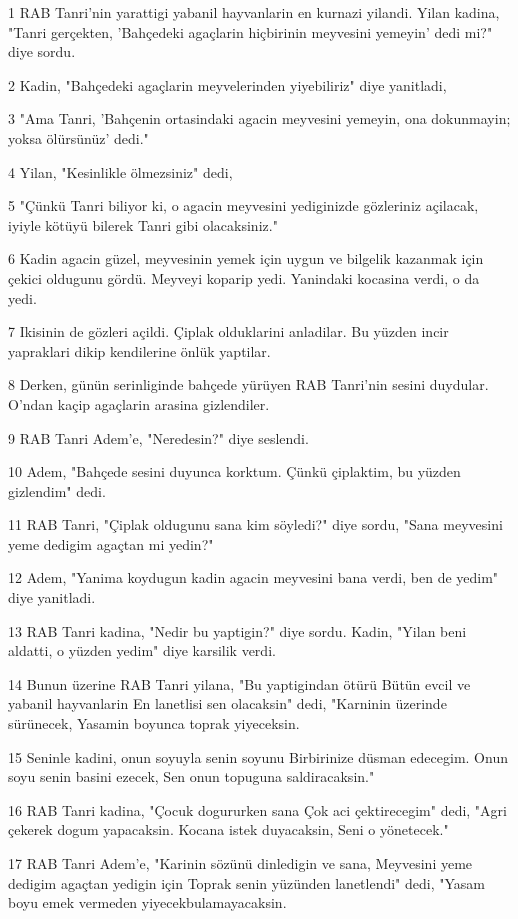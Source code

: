 \par 1 RAB Tanri'nin yarattigi yabanil hayvanlarin en kurnazi yilandi. Yilan kadina, "Tanri gerçekten, 'Bahçedeki agaçlarin hiçbirinin meyvesini yemeyin' dedi mi?" diye sordu.
\par 2 Kadin, "Bahçedeki agaçlarin meyvelerinden yiyebiliriz" diye yanitladi,
\par 3 "Ama Tanri, 'Bahçenin ortasindaki agacin meyvesini yemeyin, ona dokunmayin; yoksa ölürsünüz' dedi."
\par 4 Yilan, "Kesinlikle ölmezsiniz" dedi,
\par 5 "Çünkü Tanri biliyor ki, o agacin meyvesini yediginizde gözleriniz açilacak, iyiyle kötüyü bilerek Tanri gibi olacaksiniz."
\par 6 Kadin agacin güzel, meyvesinin yemek için uygun ve bilgelik kazanmak için çekici oldugunu gördü. Meyveyi koparip yedi. Yanindaki kocasina verdi, o da yedi.
\par 7 Ikisinin de gözleri açildi. Çiplak olduklarini anladilar. Bu yüzden incir yapraklari dikip kendilerine önlük yaptilar.
\par 8 Derken, günün serinliginde bahçede yürüyen RAB Tanri'nin sesini duydular. O'ndan kaçip agaçlarin arasina gizlendiler.
\par 9 RAB Tanri Adem'e, "Neredesin?" diye seslendi.
\par 10 Adem, "Bahçede sesini duyunca korktum. Çünkü çiplaktim, bu yüzden gizlendim" dedi.
\par 11 RAB Tanri, "Çiplak oldugunu sana kim söyledi?" diye sordu, "Sana meyvesini yeme dedigim agaçtan mi yedin?"
\par 12 Adem, "Yanima koydugun kadin agacin meyvesini bana verdi, ben de yedim" diye yanitladi.
\par 13 RAB Tanri kadina, "Nedir bu yaptigin?" diye sordu. Kadin, "Yilan beni aldatti, o yüzden yedim" diye karsilik verdi.
\par 14 Bunun üzerine RAB Tanri yilana, "Bu yaptigindan ötürü Bütün evcil ve yabanil hayvanlarin En lanetlisi sen olacaksin" dedi, "Karninin üzerinde sürünecek, Yasamin boyunca toprak yiyeceksin.
\par 15 Seninle kadini, onun soyuyla senin soyunu Birbirinize düsman edecegim. Onun soyu senin basini ezecek, Sen onun topuguna saldiracaksin."
\par 16 RAB Tanri kadina, "Çocuk dogururken sana Çok aci çektirecegim" dedi, "Agri çekerek dogum yapacaksin. Kocana istek duyacaksin, Seni o yönetecek."
\par 17 RAB Tanri Adem'e, "Karinin sözünü dinledigin ve sana, Meyvesini yeme dedigim agaçtan yedigin için Toprak senin yüzünden lanetlendi" dedi, "Yasam boyu emek vermeden yiyecekbulamayacaksin.
